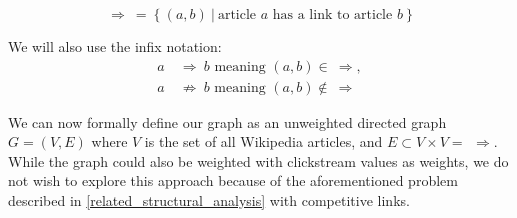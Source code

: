 $$\Rightarrow\ =\ \{\ (a,b)\ |\ \text{article } a \text{ has a link to article } b\ \}$$

We will also use the infix notation:
\begin{align*}
a\ &\Rightarrow\ b \text{ meaning } (a,b) \in\ \Rightarrow,\\
a\ &\not\Rightarrow\ b \text{ meaning } (a,b) \not\in\ \Rightarrow
\end{align*}

We can now formally define our graph as an unweighted directed graph $G = (V,E)$ where $V$ is the set of all Wikipedia articles, and $E\subset V \times V = \ \, \Rightarrow$. While the graph could also be weighted with clickstream values as weights, we do not wish to explore this approach because of the aforementioned problem described in \cref{related_structural_analysis} with competitive links.